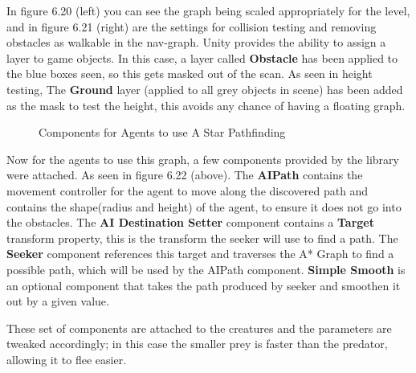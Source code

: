\documentclass[11pt]{report}
\begin{document}
In figure 6.20 (left) you can see the graph being scaled appropriately for the level, and in figure 6.21 (right) are the settings for collision testing and removing obstacles as walkable in the nav-graph. Unity provides the ability to assign a layer to game objects. In this case, a layer called \textbf{Obstacle} has been applied to the blue boxes seen, so this gets masked out of the scan. As seen in height testing, The \textbf{Ground} layer (applied to all grey objects in scene) has been added as the mask to test the height, this avoids any chance of having a floating graph.

\begin{figure}[H]
    \centering
    \caption{Components for Agents to use A Star Pathfinding}
\end{figure}

Now for the agents to use this graph, a few components provided by the library were attached. As seen in figure 6.22 (above). The \textbf{AIPath} contains the movement controller for the agent to move along the discovered path and contains the shape(radius and height) of the agent, to ensure it does not go into the obstacles. The \textbf{AI Destination Setter} component contains a \textbf{Target} transform property, this is the transform the seeker will use to find a path. The \textbf{Seeker} component references this target and traverses the A* Graph to find a possible path, which will be used by the AIPath component. \textbf{Simple Smooth} is an optional component that takes the path produced by seeker and smoothen it out by a given value.

These set of components are attached to the creatures and the parameters are tweaked accordingly; in this case the smaller prey is faster than the predator, allowing it to flee easier.
\end{document}
